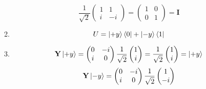 \documentclass[12pt]{article}
\begin{document}
\begin{enumerate}[font=\bfseries]
\begin{enumerate}
\[                        \frac{1}{\sqrt{2}}\begin{pmatrix}
                        1 & 1 \\
                        i & -i
                        \end{pmatrix}
                        =
                        \begin{pmatrix}
                        1 & 0 \\
                        0 & 1
                        \end{pmatrix}
                        = \mathbf{I}
                        \]
                
            \item \[U = \ket{+y}\bra{0} + \ket{-y}\bra{1}\]
            \item \[
                    \mathbf{Y}\ket{+y} = \begin{pmatrix}
                                        0 & -i \\
                                        i & 0
                                        \end{pmatrix}
                                        \frac{1}{\sqrt{2}}
                                        \begin{pmatrix}
                                        1 \\ i
                                        \end{pmatrix}
                                        =
                                        \frac{1}{\sqrt{2}}
                                        \begin{pmatrix}
                                        1 \\ i
                                        \end{pmatrix}
                                        =
                                        \ket{+y}
                    \]
                    \[
                    \mathbf{Y}\ket{-y} = \begin{pmatrix}
                                        0 & -i \\
                                        i & 0
                                        \end{pmatrix}
                                        \frac{1}{\sqrt{2}}
                                        \begin{pmatrix}
                                        1 \\ -i
                                        \end{pmatrix}
\]
\end{enumerate}
\end{enumerate}
\end{document}
